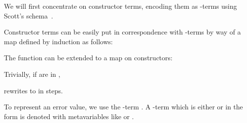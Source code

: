 \documentclass{LMCS}
\newenvironment{varitemize}
{
\begin{list}{\labelitemi}
{\setlength{\itemsep}{0.0mm}
 \setlength{\topsep}{0.0mm}
 \setlength{\parindent}{0.0mm}
 \setlength{\parskip}{0.0mm}
 \setlength{\parsep}{0.0mm}
 \setlength{\partopsep}{0.0mm}
 \setlength{\leftmargin}{15pt}
 \setlength{\labelsep}{5pt}
 \setlength{\labelwidth}{10pt}}}
{
 \end{list} 
}
\begin{document}
We will first concentrate on constructor terms, encoding them as
-terms using Scott's schema~\cite{Wadsworth80}. 
\begin{defi}\label{Def-TRSonetolambdaI}
\begin{varitemize}
\item
  Constructor terms can be easily put in correspondence with -terms
  by way of a map  defined by induction as follows:
  
\item
  The function  can be extended to a map on constructors:
  
  Trivially, if   are in ,
  
  rewrites to  in
   steps. 
\item
  To represent an error value, we use the -term
  . A -term which is either  or in
  the form  is denoted with metavariables like
   or .
\end{varitemize}
\end{defi}
\end{document}
